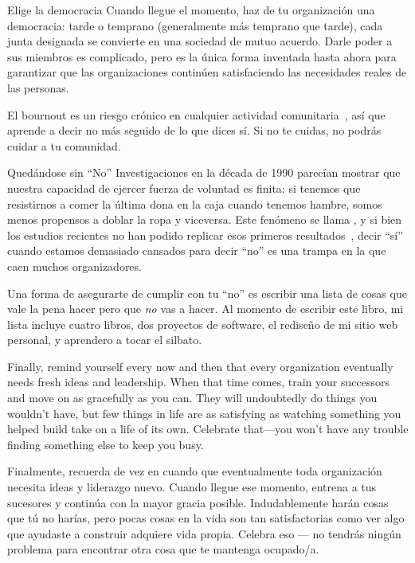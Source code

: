 \begin{aside}{Elige la democracia}
  Cuando llegue el momento, 
  haz de tu organización una democracia:
  tarde o temprano (generalmente más temprano que tarde), 
  cada junta designada se convierte en una sociedad de mutuo acuerdo.
  Darle poder a sus miembros es complicado, 
  pero es la única forma inventada hasta ahora para garantizar 
  que las organizaciones continúen satisfaciendo las necesidades reales de las personas.
\end{aside}


El bournout es un riesgo crónico en cualquier actividad comunitaria~\cite{Pign2016},
así que aprende a decir no más seguido de lo que dices sí.
Si no te cuidas,
no podrás cuidar a tu comunidad.

\begin{aside}{Quedándose sin ``No''}
  Investigaciones en la década de 1990 parecían mostrar que nuestra capacidad de ejercer fuerza de voluntad es finita:
  si tenemos que resistirnos a comer la última dona en la caja cuando tenemos hambre,
  somos menos propensos a doblar la ropa y viceversa.
  Este fenómeno se llama ,
  y si bien los estudios recientes no han podido replicar esos primeros resultados~\cite{Hagg2016},
  decir ``sí'' cuando estamos demasiado cansados ​​para decir ``no''
  es una trampa en la que caen muchos organizadores.
\end{aside}

Una forma de asegurarte de cumplir con tu ``no'' 
es escribir una lista de cosas que vale la pena hacer 
pero que \emph{no} vas a hacer.
Al momento de escribir este libro, mi lista incluye cuatro libros, 
dos proyectos de software,
el rediseño de mi sitio web personal,
y aprendero a tocar el silbato.

Finally,
remind yourself every now and then that
every organization eventually needs fresh ideas and leadership.
When that time comes,
train your successors and move on as gracefully as you can.
They will undoubtedly do things you wouldn't have,
but few things in life are as satisfying as
watching something you helped build take on a life of its own.
Celebrate that---you won't have any trouble finding something else to keep you busy.

Finalmente,
recuerda de vez en cuando que
eventualmente toda organización necesita ideas y liderazgo nuevo.
Cuando llegue ese momento,
entrena a tus sucesores y continúa con la mayor gracia posible.
Indudablemente harán cosas que tú no harías,
pero pocas cosas en la vida son tan satisfactorias como
ver algo que ayudaste a construir adquiere vida propia.
Celebra eso --- no tendrás ningún problema para encontrar otra cosa que te mantenga ocupado/a.

